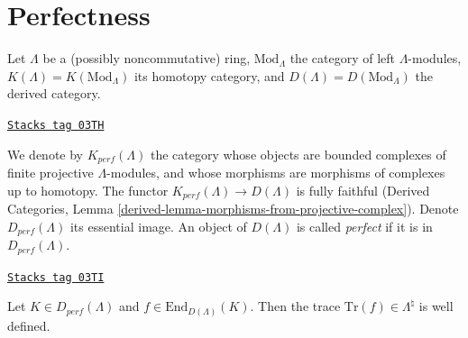
\section{Perfectness}
\label{trace-section-perfect}
Let $\Lambda$ be a (possibly noncommutative) ring, $\text{Mod}_{\Lambda}$ the
category of left $\Lambda$-modules, $K(\Lambda) = K(\text{Mod}_\Lambda)$ its
homotopy category, and $D(\Lambda)= D(\text{Mod}_\Lambda)$ the derived
category.

\begin{definition}[Perfect]
\label{trace-definition-perfect}
\href{https://stacks.math.columbia.edu/tag/03TH}{\texttt{Stacks tag 03TH}}

We denote by $K_{perf}(\Lambda)$ the category whose objects are bounded
complexes of finite projective $\Lambda$-modules, and whose morphisms are
morphisms of complexes up to homotopy. The functor $K_{perf}(\Lambda)\to
D(\Lambda)$ is fully faithful (Derived Categories, Lemma
\ref{derived-lemma-morphisms-from-projective-complex}).
Denote $D_{perf}(\Lambda)$ its essential image.
An object of $D(\Lambda)$ is called {\it perfect} if it is in
$D_{perf}(\Lambda)$.
\end{definition}

\begin{proposition}
\label{trace-proposition-trace-well-defined}
\href{https://stacks.math.columbia.edu/tag/03TI}{\texttt{Stacks tag 03TI}}

Let $K\in D_{perf}(\Lambda)$ and $f\in \text{End}_{D(\Lambda)}(K)$. Then the
trace $\text{Tr}(f)\in \Lambda^\natural$ is well defined.
\end{proposition}

